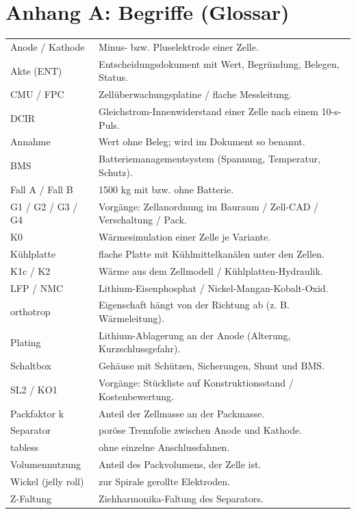 \documentclass[10pt,a4paper]{article}
\begin{document}
\section*{Anhang A: Begriffe (Glossar)}
\begin{tabularx}{\linewidth}{@{}lX@{}}\toprule
Anode / Kathode & Minus- bzw. Pluselektrode einer Zelle.\\
Akte (ENT) & Entscheidungsdokument mit Wert, Begründung, Belegen, Status.\\
CMU / FPC & Zellüberwachungsplatine / flache Messleitung.\\
DCIR & Gleichstrom-Innenwiderstand einer Zelle nach einem 10-s-Puls.\\
Annahme & Wert ohne Beleg; wird im Dokument so benannt.\\
BMS & Batteriemanagementsystem (Spannung, Temperatur, Schutz).\\
Fall A / Fall B & 1500 kg mit bzw. ohne Batterie.\\
G1 / G2 / G3 / G4 & Vorgänge: Zellanordnung im Bauraum / Zell-CAD / Verschaltung / Pack.\\
K0 & Wärmesimulation einer Zelle je Variante.\\
Kühlplatte & flache Platte mit Kühlmittelkanälen unter den Zellen.\\
K1c / K2 & Wärme aus dem Zellmodell / Kühlplatten-Hydraulik.\\
LFP / NMC & Lithium-Eisenphosphat / Nickel-Mangan-Kobalt-Oxid.\\
orthotrop & Eigenschaft hängt von der Richtung ab (z. B. Wärmeleitung).\\
Plating & Lithium-Ablagerung an der Anode (Alterung, Kurzschlussgefahr).\\
Schaltbox & Gehäuse mit Schützen, Sicherungen, Shunt und BMS.\\
SL2 / KO1 & Vorgänge: Stückliste auf Konstruktionsstand / Kostenbewertung.\\
Packfaktor k & Anteil der Zellmasse an der Packmasse.\\
Separator & poröse Trennfolie zwischen Anode und Kathode.\\
tabless & ohne einzelne Anschlussfahnen.\\
Volumennutzung & Anteil des Packvolumens, der Zelle ist.\\
Wickel (jelly roll) & zur Spirale gerollte Elektroden.\\
Z-Faltung & Ziehharmonika-Faltung des Separators.\\\bottomrule
\end{tabularx}
\end{document}
